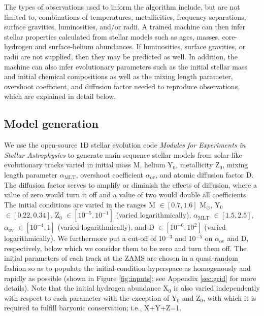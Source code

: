 \documentclass[iop,apj,twocolappendix]{emulateapj}
\begin{document}
The types of observations used to inform the algorithm include, but are not limited to, combinations of temperatures, metallicities, frequency separations, surface gravities, luminosities, and/or radii. A trained machine can then infer stellar properties calculated from stellar models such as ages, masses, core-hydrogen and surface-helium abundances. If luminosities, surface gravities, or radii are not supplied, then they may be predicted as well. In addition, the machine can also infer evolutionary parameters such as the initial stellar mass and initial chemical compositions as well as the mixing length parameter, overshoot coefficient, and diffusion factor needed to reproduce observations, which are explained in detail below. %


\subsection{Model generation}
\label{sec:models}
We use the open-source 1D stellar evolution code \emph{Modules for Experiments in Stellar Astrophysics} \citep[MESA,][]{Paxton2011} to generate main-sequence stellar models from solar-like evolutionary tracks varied in initial mass M, helium Y$_0$, metallicity Z$_0$, mixing length parameter $\alpha_{\text{MLT}}$, overshoot coefficient $\alpha_{\text{ov}}$, and atomic diffusion factor D. The diffusion factor serves to amplify or diminish the effects of diffusion, where a value of zero would turn it off and a value of two would double all coefficients. The initial conditions are varied in the ranges M $\in [0.7, 1.6]$ M$_\odot$, Y$_0$ $\in [0.22, 0.34]$, Z$_0$ $\in [10^{-5}, 10^{-1}]$ (varied logarithmically), $\alpha_{\text{MLT}}$ $\in [1.5, 2.5]$, $\alpha_{\text{ov}}$ $\in [10^{-4}, 1]$ (varied logarithmically), and D $\in [10^{-6}, 10^2]$ (varied logarithmically). We furthermore put a cut-off of 10$^{-3}$ and 10$^{-5}$ on $\alpha_{\text{ov}}$ and D, respectively, below which we consider them to be zero and turn them off. The initial parameters of each track at the ZAMS are chosen in a quasi-random fashion so as to populate the initial-condition hyperspace as homogenously and rapidly as possible (shown in Figure \ref{fig:inputs}; see Appendix \ref{sec:grid} for more details). Note that the initial hydrogen abundance X$_0$ is also varied independently with respect to each parameter with the exception of Y$_0$ and Z$_0$, with which it is required to fulfill baryonic conservation; i.e., X+Y+Z=1. 
\end{document}
